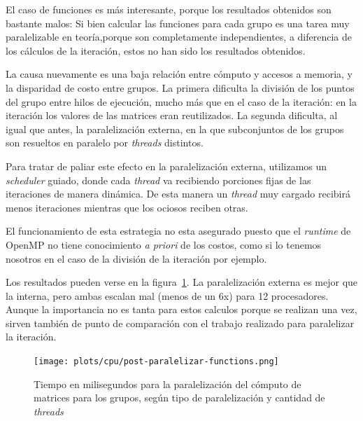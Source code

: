 El caso de funciones es m\'as interesante, porque los resultados obtenidos son
bastante malos: Si bien calcular las funciones para cada grupo es una tarea muy
paralelizable en teor\'ia,porque son completamente independientes, a diferencia de
los c\'alculos de la iteraci\'on, estos no han sido los resultados obtenidos.

La causa nuevamente es una baja relaci\'on entre c\'omputo y accesos a memoria,
y la disparidad de costo entre grupos. La primera dificulta la divisi\'on de los
puntos del grupo entre hilos de ejecuci\'on, mucho m\'as que en el caso de la iteraci\'on: en la iteraci\'on los
valores de las matrices eran reutilizados. La segunda dificulta, al igual que antes, la
paralelizaci\'on externa, en la que subconjuntos de los grupos son resueltos
en paralelo por \textit{threads} distintos.

Para tratar de paliar este efecto en la paralelizaci\'on externa, utilizamos un
\textit{scheduler} guiado, donde cada \textit{thread} va recibiendo porciones
fijas de las iteraciones de manera din\'amica. De esta manera un \textit{thread}
muy cargado recibir\'a menos iteraciones mientras que los ociosos reciben otras.

El funcionamiento de esta estrategia no esta asegurado puesto que el \textit{runtime}
de OpenMP no tiene conocimiento \textit{a priori} de los costos, como si lo tenemos
nosotros en el caso de la divisi\'on de la iteraci\'on por ejemplo.

Los resultados pueden verse en la figura~\ref{fig:functions-paralelizado}. La
paralelizaci\'on externa es mejor que la interna, pero ambas escalan mal (menos
de un 6x) para 12 procesadores. Aunque la importancia no es tanta para estos
calculos porque se realizan una vez, sirven tambi\'en de punto de comparaci\'on
con el trabajo realizado para paralelizar la iteraci\'on.

\begin{figure}[htbp]
   \centering
   \texttt{[image: plots/cpu/post-paralelizar-functions.png]}
   \caption{Tiempo en milisegundos para la paralelizaci\'on del c\'omputo
   de matrices para los grupos, según tipo de paralelización y cantidad de
   \textit{threads}}
   \label{fig:functions-paralelizado}
\end{figure}
